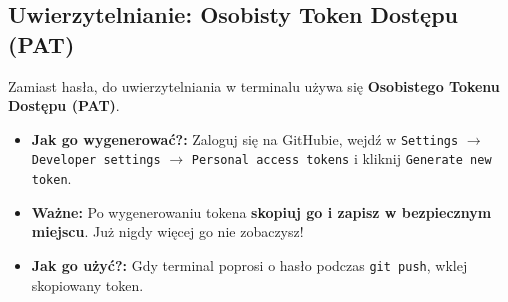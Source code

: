 \subsection{Uwierzytelnianie: Osobisty Token Dostępu (PAT)}
Zamiast hasła, do uwierzytelniania w terminalu używa się \textbf{Osobistego Tokenu Dostępu (PAT)}.
\begin{itemize}
    \item \textbf{Jak go wygenerować?:} Zaloguj się na GitHubie, wejdź w \texttt{Settings} $\rightarrow$ \texttt{Developer settings} $\rightarrow$ \texttt{Personal access tokens} i kliknij \texttt{Generate new token}.
    \item \textbf{Ważne:} Po wygenerowaniu tokena \textbf{skopiuj go i zapisz w bezpiecznym miejscu}. Już nigdy więcej go nie zobaczysz!
    \item \textbf{Jak go użyć?:} Gdy terminal poprosi o hasło podczas \texttt{git push}, wklej skopiowany token.
\end{itemize}

